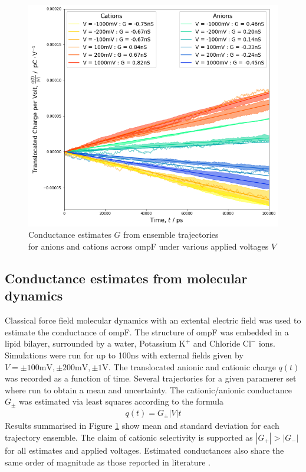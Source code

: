 \documentclass{article}[12pt]
\numberwithin{equation}{section}
\begin{document}
\begin{figure}[H]
	\centering{}
	\captionsetup{justification=centering}
	\includegraphics[scale=0.47]{conductance}
\caption{Conductance estimates $G$ from ensemble trajectories \\
for anions and cations across ompF under various applied voltages $V$ }
\label{fig:conductance}
\end{figure}

\subsection{Conductance estimates from molecular dynamics}
Classical force field molecular dynamics with an extental electric field was
used to estimate the conductance of ompF. The structure of ompF was embedded
in a lipid bilayer, surrounded by a water, Potassium $\mathrm{K^{+}}$ and
Chloride $\mathrm{Cl^{-}}$ ions. Simulations were run for up to 100ns with
external fields given by $V=\pm100\mathrm{mV},\pm200\mathrm{mV},\pm1\mathrm{V}$.
The translocated anionic and cationic charge $q(t)$ was recorded as a function of time.
Several trajectories for a given paramerer set where run to obtain a mean and
uncertainty. The cationic/anionic conductance $G_{\pm}$ was estimated via least squares according to
the formula
\begin{align}
	q(t)=G_{\pm}|V|t
\end{align}
Results summarised in Figure \ref{fig:conductance} show mean and standard
deviation for each trajectory ensemble. The claim of cationic selectivity
\cite{Benz1985} is supported as $|G_{+}|>|G_{-}|$ for all estimates and
applied voltages. Estimated conductances also share the same order of
magnitude as those reported in literature \cite{Benz1985}.



\end{document}
